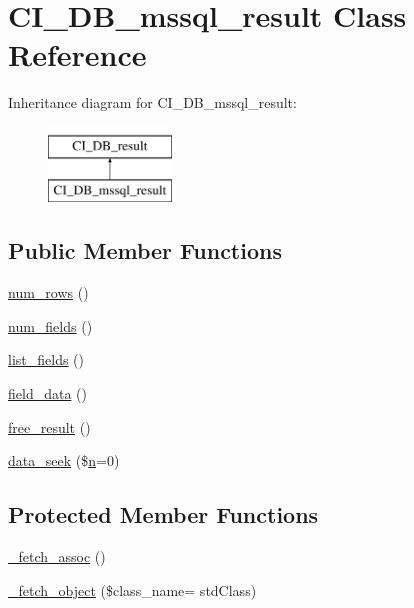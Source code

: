 \hypertarget{class_c_i___d_b__mssql__result}{}\section{C\+I\+\_\+\+D\+B\+\_\+mssql\+\_\+result Class Reference}
\label{class_c_i___d_b__mssql__result}
Inheritance diagram for C\+I\+\_\+\+D\+B\+\_\+mssql\+\_\+result\+:\begin{figure}[H]
\begin{center}
\leavevmode
\includegraphics[height=2.000000cm]{class_c_i___d_b__mssql__result}
\end{center}
\end{figure}
\subsection*{Public Member Functions}
\begin{DoxyCompactItemize}
\item 
\hyperlink{class_c_i___d_b__mssql__result_a218657c303ee499b97710ab0cd2f5d6e}{num\+\_\+rows} ()
\item 
\hyperlink{class_c_i___d_b__mssql__result_af831bf363e4d7d661a717a4932af449d}{num\+\_\+fields} ()
\item 
\hyperlink{class_c_i___d_b__mssql__result_a50b54eb4ea7cfd039740f532988ea776}{list\+\_\+fields} ()
\item 
\hyperlink{class_c_i___d_b__mssql__result_a84bffd65e53902ade1591716749a33e3}{field\+\_\+data} ()
\item 
\hyperlink{class_c_i___d_b__mssql__result_aad2d98d6beb3d6095405356c6107b473}{free\+\_\+result} ()
\item 
\hyperlink{class_c_i___d_b__mssql__result_a8255ae91816e4206e29eb7581c5af0f1}{data\+\_\+seek} (\$\hyperlink{cli_2error__general_8php_ace0fd03cd383f20ce6ea63247a207294}{n}=0)
\end{DoxyCompactItemize}
\subsection*{Protected Member Functions}
\begin{DoxyCompactItemize}
\item 
\hyperlink{class_c_i___d_b__mssql__result_a43a9a92817f1334a1c10752ec44275a0}{\+\_\+fetch\+\_\+assoc} ()
\item 
\hyperlink{class_c_i___d_b__mssql__result_ac0acae0a13c8bfe4c34198813ecf43a0}{\+\_\+fetch\+\_\+object} (\$class\+\_\+name= \textquotesingle{}std\+Class\textquotesingle{})
\end{DoxyCompactItemize}
